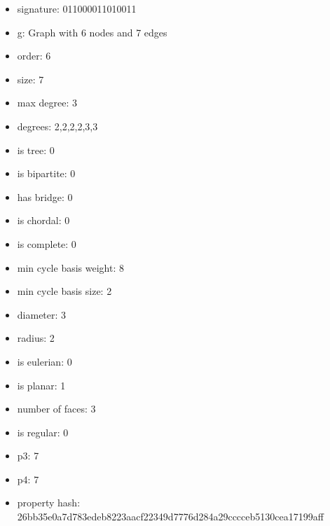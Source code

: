 \begin{itemize}
\item signature: 011000011010011
\item g: Graph with 6 nodes and 7 edges
\item order: 6
\item size: 7
\item max degree: 3
\item degrees: 2,2,2,2,3,3
\item is tree: 0
\item is bipartite: 0
\item has bridge: 0
\item is chordal: 0
\item is complete: 0
\item min cycle basis weight: 8
\item min cycle basis size: 2
\item diameter: 3
\item radius: 2
\item is eulerian: 0
\item is planar: 1
\item number of faces: 3
\item is regular: 0
\item p3: 7
\item p4: 7
\item property hash: 26bb35e0a7d783edeb8223aacf22349d7776d284a29cccceb5130cea17199aff
\end{itemize}
\newpage
\begin{figure}
\end{figure}
